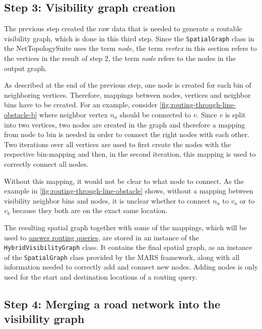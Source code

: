 	\subsection{Step 3: Visibility graph creation}
	\label{subsec:step-3-graph-creation}
	
		The previous step created the raw data that is needed to generate a routable visibility graph, which is done in this third step.
		Since the \texttt{SpatialGraph} class in the NetTopologySuite uses the term \emph{node}, the term \emph{vertex} in this section refers to the vertices in the result of step 2, the term \emph{node} refers to the nodes in the output graph.
		
		As described at the end of the previous step, one node is created for each bin of neighboring vertices.
		Therefore, mappings between nodes, vertices and neighbor bins have to be created.
		For an example, consider \cref{fig:routing-through-line-obstacle-b} where neighbor vertex $n_a$ should be connected to $v$.
		Since $v$ is split into two vertices, two nodes are created in the graph and therefore a mapping from node to bin is needed in order to connect the right nodes with each other.
		Two iterations over all vertices are used to first create the nodes with the respective bin-mapping and then, in the second iteration, this mapping is used to correctly connect all nodes.
		
		Without this mapping, it would not be clear to what node to connect.
		As the example in \cref{fig:routing-through-line-obstacle} shows, without a mapping between visibility neighbor bins and nodes, it is unclear whether to connect $n_a$ to $v_a$ or to $v_b$ because they both are on the exact same location.
		
		The resulting spatial graph together with some of the mappings, which will be used to \hyperref[sec:answering-queries]{answer routing queries}, are stored in an instance of the \texttt{HybridVisibilityGraph} class.
		It contains the final spatial graph, as an instance of the \texttt{SpatialGraph} class provided by the MARS framework, along with all information needed to correctly add and connect new nodes.
		Adding nodes is only used for the start and destination locations of a routing query.
		
	\subsection{Step 4: Merging a road network into the visibility graph}
	\label{subsec:step-4-graph merging}
	
